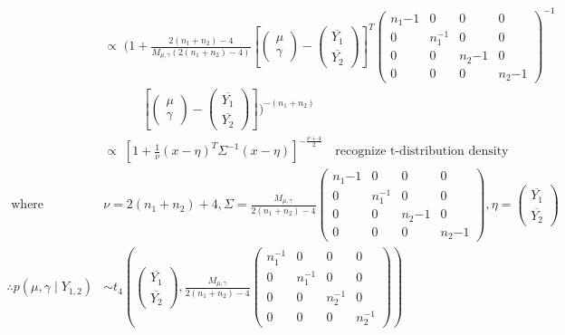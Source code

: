 \documentclass[12pt,letterpaper,twoside]{article}
\begin{document}
\begin{enumerate}[label=(\alph*)]
\begin{align*}
            & \propto \; \biggl(1 + \frac{2(n_1 + n_2) - 4}{M_{\mu, \gamma}(2(n_1 + n_2) - 4)}\left[\left(\begin{matrix}\mu\\ \gamma\end{matrix}\right) - \left(\begin{matrix*}\overline{Y_1}\\ \overline{Y_2}\end{matrix*}\right)\right]^T \left(\begin{matrix*} n_1{-1} & 0 & 0 & 0 \\ 0 & n_1^{-1} & 0 & 0 \\ 0 & 0 & n_2{-1} & 0 \\ 0 & 0 & 0 & n_2{-1} \end{matrix*}\right)^{-1} \\
            & \quad \quad \quad \left[\left(\begin{matrix}\mu\\ \gamma\end{matrix}\right) - \left(\begin{matrix*}\overline{Y_1}\\ \overline{Y_2}\end{matrix*}\right)\right]\biggr)^{-(n_1 + n_2)}\\
            & \propto \; \left[1 + \frac{1}{\nu}(x - \eta)^T\Sigma^{-1}(x - \eta)\right]^{-\frac{\nu + 4}{2}} \quad \text{recognize t-distribution density}\\
        \text{ where }\quad& \nu=2(n_1 + n_2) + 4, \Sigma=\frac{M_{\mu, \gamma}}{2(n_1 + n_2) - 4}\left(\begin{matrix*} n_1{-1} & 0 & 0 & 0 \\ 0 & n_1^{-1} & 0 & 0 \\ 0 & 0 & n_2{-1} & 0 \\ 0 & 0 & 0 & n_2{-1} \end{matrix*}\right), \eta=\left(\begin{matrix*}\overline{Y_1}\\ \overline{Y_2}\end{matrix*}\right)\\
        \therefore p(\mu, \gamma \mid Y_{1,2}) &\sim t_4\left(\left(\begin{matrix*}
            \overline{Y_1}\\ \overline{Y_2} \end{matrix*}\right), \frac{M_{\mu, \gamma}}{2(n_1 + n_2) - 4}\left(\begin{matrix*}
            n_1^{-1} & 0 & 0 & 0 \\ 0 & n_1^{-1} & 0 & 0 \\ 0 & 0 & n_2^{-1} & 0 \\ 0 & 0 & 0 & n_2^{-1}
            \end{matrix*}\right)\right)
    \end{align*}


\end{enumerate}
\end{document}
